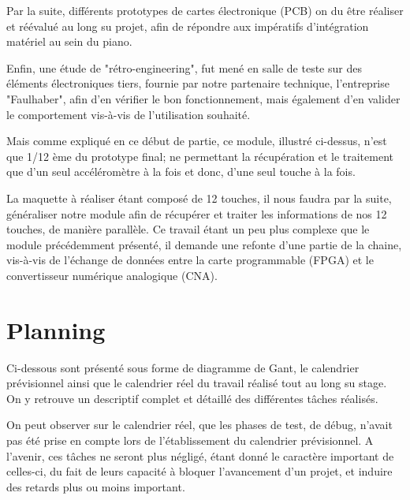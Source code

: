 \documentclass[french,a4paper,12pt]{report}
\begin{document}
	Par la suite, différents prototypes de cartes électronique (PCB) on du être réaliser et réévalué au long su projet, afin de répondre aux impératifs d'intégration matériel au sein du piano.
	
	Enfin, une étude de "rétro-engineering", fut mené en salle de teste sur des éléments électroniques tiers, fournie par notre partenaire technique, l'entreprise "Faulhaber", afin d'en vérifier le bon fonctionnement, mais également d'en valider le comportement vis-à-vis de l'utilisation souhaité.
	
	Mais comme expliqué en ce début de partie, ce module, illustré ci-dessus, n'est que 1/12 ème du prototype final; ne permettant la récupération et le traitement que d'un seul accéléromètre à la fois et donc, d'une seul touche à la fois.
	
	La maquette à réaliser étant composé de 12 touches, il nous faudra par la suite, généraliser notre module afin de récupérer et traiter les informations de nos 12 touches, de manière parallèle.
	Ce travail étant un peu plus complexe que le module précédemment présenté, il demande une refonte d'une partie de la chaine, vis-à-vis de l'échange de données entre la carte programmable (FPGA) et le convertisseur numérique analogique (CNA).
	
	\chapter{Planning}

	Ci-dessous sont présenté sous forme de diagramme de Gant, le calendrier prévisionnel ainsi que le calendrier réel du travail réalisé tout au long su stage.
	On y retrouve un descriptif complet et détaillé des différentes tâches réalisés.
	
	On peut observer sur le calendrier réel, que les phases de test, de débug, n'avait pas été prise en compte lors de l'établissement du calendrier prévisionnel.
	A l'avenir, ces tâches ne seront plus négligé, étant donné le caractère important de celles-ci, du fait de leurs capacité à bloquer l'avancement d'un projet, et induire des retards plus ou moins important.
	
	
	
	
	
		
	
	
	
	
%
%
\end{document}
